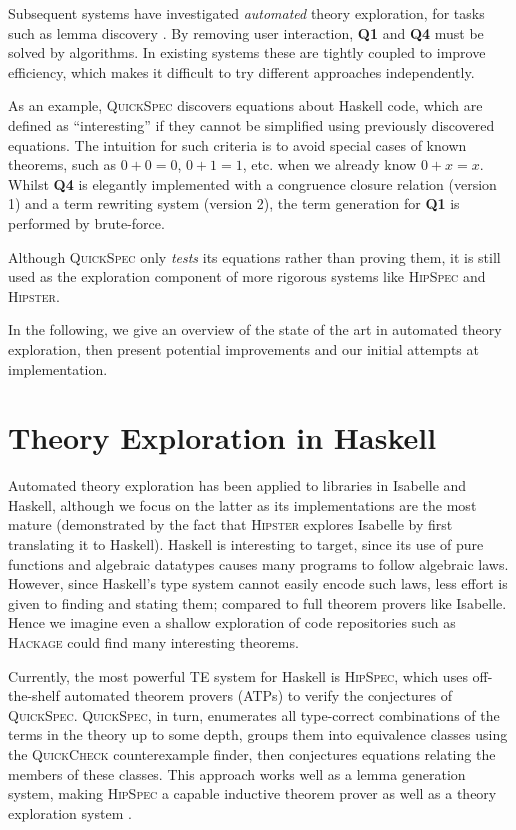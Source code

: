 \documentclass{llncs}
\begin{document}
Subsequent systems have investigated \emph{automated} theory exploration, for
tasks such as lemma discovery \cite{Hipster}. By removing user interaction,
\textbf{Q1} and \textbf{Q4} must be solved by algorithms. In existing
systems these are tightly coupled to improve efficiency, which makes it
difficult to try different approaches independently.

As an example, \textsc{QuickSpec} \cite{QuickSpec} discovers equations about
Haskell code, which are defined as ``interesting'' if they cannot be simplified
using previously discovered equations. The intuition for such criteria is to
avoid special cases of known theorems, such as $0 + 0 = 0$, $0 + 1 = 1$, etc.
when we already know $0 + x = x$. Whilst \textbf{Q4} is elegantly implemented
with a congruence closure relation (version 1) and a term rewriting system
(version 2), the term generation for \textbf{Q1} is performed by brute-force.

Although \textsc{QuickSpec} only \emph{tests} its equations rather than
proving them, it is still used as the exploration component of more rigorous
systems like \textsc{HipSpec} and \textsc{Hipster}.

In the following, we give an overview of the state of the art in automated
theory exploration, then present potential improvements and our initial attempts
at implementation.

\section{Theory Exploration in Haskell}\label{haskell}

Automated theory exploration has been applied to libraries in Isabelle
and Haskell, although we focus on the latter as its implementations are
the most mature (demonstrated by the fact that \textsc{Hipster} explores
Isabelle by first translating it to Haskell). Haskell is interesting to target,
since its use of pure functions and algebraic datatypes causes many programs to
follow algebraic laws. However, since Haskell's type system cannot easily
encode such laws, less effort is given to finding and stating them; compared to
full theorem provers like Isabelle. Hence we imagine even a shallow exploration
of code repositories such as \textsc{Hackage} could find many interesting
theorems.

Currently, the most powerful TE system for Haskell is \textsc{HipSpec}, which
uses off-the-shelf automated theorem provers (ATPs) to verify the conjectures of
\textsc{QuickSpec}. \textsc{QuickSpec}, in turn, enumerates all type-correct combinations
of the terms in the theory up to some depth, groups them into equivalence
classes using the \textsc{QuickCheck} counterexample finder, then conjectures
equations relating the members of these classes. This approach works well as a
lemma generation system, making \textsc{HipSpec} a capable inductive theorem
prover as well as a theory exploration system \cite{claessen2013automating}.
\end{document}
